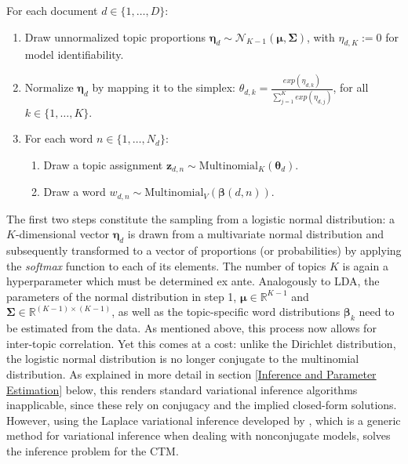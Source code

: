 \vspace{0.25cm}
\noindent
For each document $d \in \{1,\dots,D\}$:

\begin{enumerate}[{1)}]
\item Draw unnormalized topic proportions $\boldsymbol{\eta}_d \sim \mathcal{N}_{K-1}(\boldsymbol{\mu}, \boldsymbol{\Sigma})$, with $\eta_{d,K} := 0$ for model identifiability.
\item Normalize $\boldsymbol{\eta}_d$ by mapping it to the simplex: $\theta_{d,k} = \frac{exp(\eta_{d,k})}{\sum_{j=1}^{K}exp(\eta_{d,j})}$, for all $k \in \{1,\dots,K\}$.
\item For each word $n \in \{1,\dots,N_d\}$:
	\begin{enumerate}[{a)}]   
    \item Draw a topic assignment $\boldsymbol{z}_{d,n} \sim \text{Multinomial}_K(\boldsymbol{\theta}_d)$.    
    \item Draw a word $w_{d,n} \sim \text{Multinomial}_V(\boldsymbol{\beta}(d,n))$.
	\end{enumerate}
\end{enumerate}

\noindent
The first two steps constitute the sampling from a logistic normal distribution: a $K$-dimensional vector $\boldsymbol{\eta}_d$ is drawn from a multivariate normal distribution and subsequently transformed to a vector of proportions (or probabilities) by applying the \textit{softmax} function to each of its elements. The number of topics $K$ is again a hyperparameter which must be determined ex ante. Analogously to LDA, the parameters of the normal distribution in step 1, $\boldsymbol{\mu} \in \mathbb{R}^{K-1}$ and $\boldsymbol{\Sigma} \in \mathbb{R}^{(K-1) \times (K-1)}$, as well as the topic-specific word distributions $\boldsymbol{\beta}_k$ need to be estimated from the data. As mentioned above, this process now allows for inter-topic correlation. Yet this comes at a cost: unlike the Dirichlet distribution, the logistic normal distribution is no longer conjugate to the multinomial distribution. As explained in more detail in section \ref{Inference and Parameter Estimation} below, this renders standard variational inference algorithms inapplicable, since these rely on conjugacy and the implied closed-form solutions. However, using the Laplace variational inference developed by \cite{wang2013variational}, which is a generic method for variational inference when dealing with nonconjugate models, solves the inference problem for the CTM.

